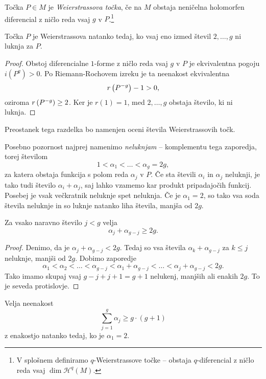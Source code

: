 \begin{definicija}
Točka $P \in M$ je \emph{Weierstrassova točka}, če na $M$ obstaja
neničelna holomorfen diferencial z ničlo reda vsaj $g$ v
$P$.\footnote{V splošnem definiramo $q$-Weierstrassove točke --
obstaja $q$-diferencial z ničlo reda vsaj $\dim \mathscr{H}^q(M)$.}
\end{definicija}

\begin{trditev}
Točka $P$ je Weierstrassova natanko tedaj, ko vsaj eno izmed števil
$2, \dots, g$ ni luknja za $P$.
\end{trditev}

\begin{proof}
Obstoj diferencialne $1$-forme z ničlo reda vsaj $g$ v $P$ je
ekvivalentna pogoju $i(P^g) > 0$. Po Riemann-Rochovem izreku je ta
neenakost ekvivalentna
\[
r \left(P^{-g}\right) - 1 > 0,
\]
oziroma $r \left(P^{-g}\right) \geq 2$. Ker je $r(1) = 1$, med
$2, \dots, g$ obstaja število, ki ni luknja.
\end{proof}

Preostanek tega razdelka bo namenjen oceni števila Weierstrassovih
točk.

Posebno pozornost najprej namenimo \emph{neluknjam} -- komplementu
tega zaporedja, torej številom
\[
1 < \alpha_1 < \dots < \alpha_g = 2g,
\]
za katera obstaja funkcija s polom reda $\alpha_j$ v $P$. Če sta
števili $\alpha_i$ in $\alpha_j$ neluknji, je tako tudi število
$\alpha_i + \alpha_j$, saj lahko vzamemo kar produkt pripadajočih
funkcij. Posebej je vsak večkratnik neluknje spet neluknja. Če je
$\alpha_1 = 2$, so tako vsa soda števila neluknje in so luknje
natanko liha števila, manjša od $2g$.

\begin{lema}
Za vsako naravno število $j < g$ velja
\[
\alpha_j + \alpha_{g-j} \geq 2g.
\]
\end{lema}

\begin{proof}
Denimo, da je $\alpha_j + \alpha_{g-j} < 2g$. Tedaj so vsa števila
$\alpha_k + \alpha_{g-j}$ za $k \leq j$ neluknje, manjši od $2g$.
Dobimo zaporedje
\[
\alpha_1 < \alpha_2 < \dots < \alpha_{g-j} <
\alpha_1 + \alpha_{g-j} < \dots < \alpha_j + \alpha_{g-j} < 2g.
\]
Tako imamo skupaj vsaj $g-j + j + 1 = g + 1$ nelukenj, manjših ali
enakih $2g$. To je seveda protislovje.
\end{proof}

\begin{lema}
Velja neenakost
\[
\sum_{j=1}^{g} \alpha_j \geq g \cdot(g+1)
\]
z enakostjo natanko tedaj, ko je $\alpha_1 = 2$.
\end{lema}

